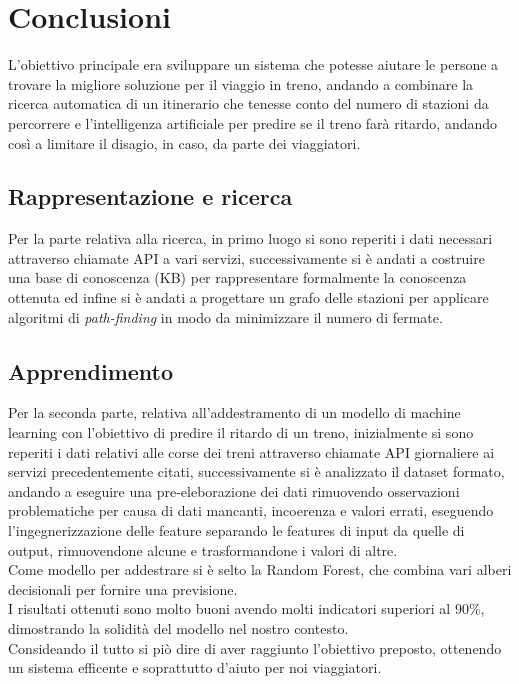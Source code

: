 \documentclass[italian,12pt,a4paper]{article}
\begin{document}
	\section{Conclusioni}
	
	L'obiettivo principale era sviluppare un sistema che potesse aiutare le persone a trovare la migliore soluzione per il viaggio in treno, andando a combinare la ricerca automatica di un itinerario che tenesse conto del numero di stazioni da percorrere e l'intelligenza artificiale per predire se il treno farà ritardo, andando così a limitare il disagio, in caso, da parte dei viaggiatori. \\
	\subsection{Rappresentazione e ricerca}
	Per la parte relativa alla ricerca, in primo luogo si sono reperiti i dati necessari attraverso chiamate API a vari servizi, successivamente si è andati a costruire una base di conoscenza (KB) per rappresentare formalmente la conoscenza ottenuta ed infine si è andati a progettare un grafo delle stazioni per applicare algoritmi di \textit{path-finding} in modo da minimizzare il numero di fermate.
	\subsection{Apprendimento}
	Per la seconda parte, relativa all'addestramento di un modello di machine learning con l'obiettivo di predire il ritardo di un treno, inizialmente si sono reperiti i dati relativi alle corse dei treni attraverso chiamate API giornaliere ai servizi precedentemente citati, successivamente si è analizzato il dataset formato, andando a eseguire una pre-eleborazione dei dati rimuovendo osservazioni problematiche per causa di dati mancanti, incoerenza e valori errati, eseguendo l'ingegnerizzazione delle feature separando le features di input da quelle di output, rimuovendone alcune e trasformandone i valori di altre.\\
	Come modello per addestrare si è selto la Random Forest, che combina vari alberi decisionali per fornire una previsione. \\
	I risultati ottenuti sono molto buoni avendo molti indicatori superiori al $90\%$, dimostrando la solidità del modello nel nostro contesto. \\
	\linebreak
	Consideando il tutto si piò dire di aver raggiunto l'obiettivo preposto, ottenendo un sistema efficente e soprattutto d'aiuto per noi viaggiatori.
\end{document}
